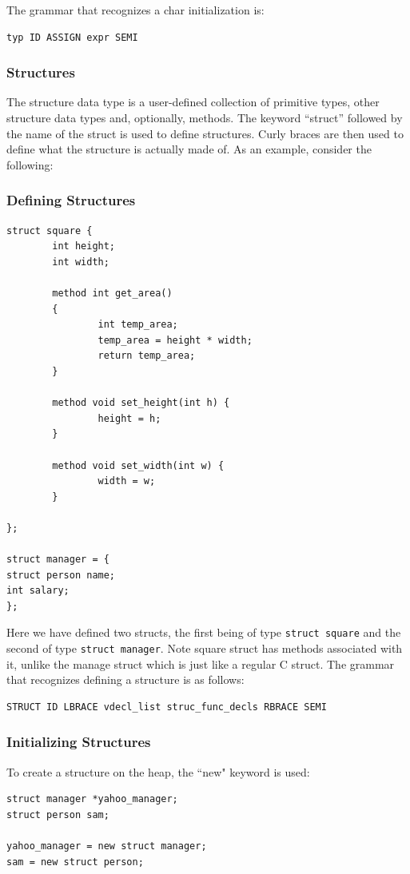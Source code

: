 \documentclass{article}
\begin{document}
The grammar that recognizes a char initialization is: 
\begin{Verbatim}[frame=single]
typ ID ASSIGN expr SEMI
\end{Verbatim}

\subsubsection{Structures}
The structure data type is a user-defined collection of primitive types, other structure data types and, optionally, methods. The keyword ``struct'' followed by the name of the struct is used to define structures. Curly braces are then used to define what the structure is actually made of. As an example, consider the following:

\subsubsection{Defining Structures}

\begin{lstlisting}
struct square {
        int height;
        int width;

        method int get_area()
        {
                int temp_area;
                temp_area = height * width;
                return temp_area;
        }

        method void set_height(int h) {
                height = h;
        }

        method void set_width(int w) {
                width = w;
        }

};

struct manager = {
struct person name;
int salary;
};
\end{lstlisting}
Here we have defined two structs, the first being of type \texttt{struct square} and the second of type \texttt{struct manager}. Note square struct has methods associated with it, unlike the manage struct which is just like a regular C struct.  The grammar that recognizes defining a structure is as follows:

\begin{Verbatim}[frame=single]
STRUCT ID LBRACE vdecl_list struc_func_decls RBRACE SEMI
\end{Verbatim}

\subsubsection{Initializing Structures}
To create a structure on the heap, the ``new" keyword is used:
\begin{lstlisting}
struct manager *yahoo_manager;
struct person sam;

yahoo_manager = new struct manager;
sam = new struct person;

\end{lstlisting}
\end{document}
